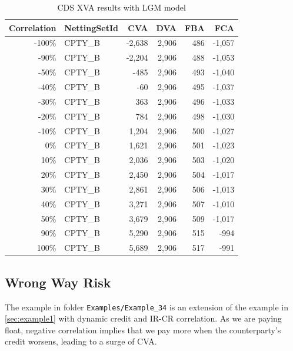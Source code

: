 \documentclass[12pt, a4paper]{article}
\begin{document}
\begin{table}[hbt]
\scriptsize
\begin{center}
\begin{tabular}{|r|l|r|r|r|r|}
\hline
Correlation & NettingSetId & CVA & DVA & FBA & FCA \\
\hline
-100\%  &  CPTY\_B  &  -2,638  &  2,906  &  486  &  -1,057 \\
 -90\%  &  CPTY\_B  &  -2,204  &  2,906  &  488  &  -1,053 \\
 -50\%  &  CPTY\_B  &    -485  &  2,906  &  493  &  -1,040 \\
 -40\%  &  CPTY\_B  &     -60  &  2,906  &  495  &  -1,037 \\
 -30\%  &  CPTY\_B  &     363  &  2,906  &  496  &  -1,033 \\
 -20\%  &  CPTY\_B  &     784  &  2,906  &  498  &  -1,030 \\
 -10\%  &  CPTY\_B  &   1,204  &  2,906  &  500  &  -1,027 \\
   0\%  &  CPTY\_B  &   1,621  &  2,906  &  501  &  -1,023 \\
  10\%  &  CPTY\_B  &   2,036  &  2,906  &  503  &  -1,020 \\
  20\%  &  CPTY\_B  &   2,450  &  2,906  &  504  &  -1,017 \\
  30\%  &  CPTY\_B  &   2,861  &  2,906  &  506  &  -1,013 \\
  40\%  &  CPTY\_B  &   3,271  &  2,906  &  507  &  -1,010 \\
  50\%  &  CPTY\_B  &   3,679  &  2,906  &  509  &  -1,017 \\
  90\%  &  CPTY\_B  &   5,290  &  2,906  &  515  &    -994 \\
 100\%  &  CPTY\_B  &   5,689  &  2,906  &  517  &    -991 \\
\hline
\end{tabular}
\caption{CDS XVA results with LGM model}
\end{center}
\end{table}

\subsection{Wrong Way Risk}%
\label{example:34}

The example in folder {\tt Examples/Example\_34} is an extension of the example in
\ref{sec:example1} with dynamic credit and IR-CR correlation. As we are paying
float, negative correlation implies that we pay more when the counterparty's credit
worsens, leading to a surge of CVA.
\end{document}
